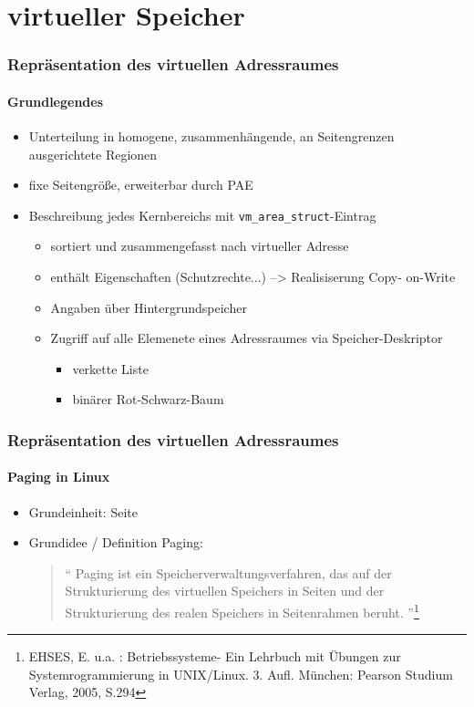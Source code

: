 \documentclass[ddcfooter]{tudbeamer}
\begin{document}
\section{virtueller Speicher}
\begin{frame}
    \frametitle{Repräsentation des virtuellen Adressraumes}
    \framesubtitle{Grundlegendes}
    \begin{itemize}
         \item   Unterteilung in homogene, zusammenhängende, an Seitengrenzen ausgerichtete 			Regionen
         \item fixe Seitengröße, erweiterbar durch PAE
         \item Beschreibung jedes Kernbereichs mit \texttt{vm\_area\_struct}-Eintrag 
         \begin{itemize}
         		\item sortiert und zusammengefasst nach virtueller Adresse\\
		\item enthält Eigenschaften (Schutzrechte...)
			--> Realisiserung Copy- on-Write
		\item Angaben über Hintergrundspeicher
    		\item Zugriff auf alle Elemenete eines Adressraumes via Speicher-Deskriptor
		\begin{itemize}
			\item verkette Liste
			\item binärer Rot-Schwarz-Baum
		\end{itemize}
   	\end{itemize} 
     \end{itemize}
    
\end{frame}

\begin{frame}
    \frametitle{Repräsentation des virtuellen Adressraumes}
    \framesubtitle {Paging in Linux}
    \begin{itemize}
         \item  Grundeinheit: Seite
         \item Grundidee / Definition Paging: \\
        \begin{quote}
         \textquotedblleft
         Paging ist ein Speicherverwaltungsverfahren, das auf der Strukturierung  des virtuellen Speichers 	in Seiten und der Strukturierung des realen Speichers in Seitenrahmen beruht.
    	\textquotedblright \footnote {EHSES, E. u.a. : Betriebssysteme- Ein Lehrbuch mit Übungen zur   	Systemrogrammierung in UNIX/Linux. 3. Aufl. München: Pearson Studium Verlag, 2005, S.294  }
	\end{quote}
 	
	
    
    
     \end{itemize}
    
\end{frame}
\end{document}
